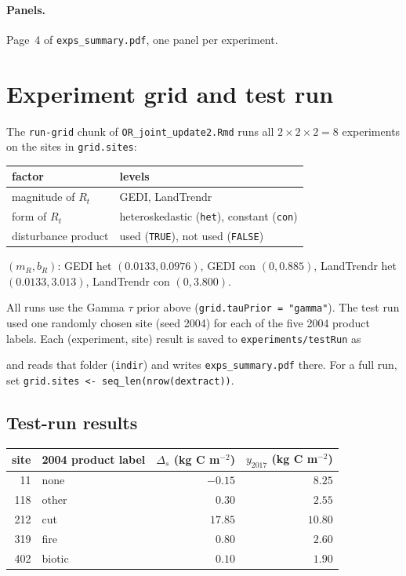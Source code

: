 \documentclass[11pt]{article}
\newcommand{\code}[1]{\texttt{#1}}
\begin{document}
\paragraph{Panels.} Page~4 of \code{exps\_summary.pdf}, one panel per experiment.

\section{Experiment grid and test run}
\label{sec:runs}

The \code{run-grid} chunk of \code{OR\_joint\_update2.Rmd} runs all $2\times2\times2 = 8$
experiments on the sites in \code{grid.sites}:

\begin{center}
\begin{tabular}{ll}
\toprule
factor & levels\\
\midrule
magnitude of $R_t$ & GEDI, LandTrendr\\
form of $R_t$ & heteroskedastic (\code{het}), constant (\code{con})\\
disturbance product & used (\code{TRUE}), not used (\code{FALSE})\\
\bottomrule
\end{tabular}

\smallskip
$(m_R, b_R)$: GEDI het $(0.0133, 0.0976)$, GEDI con $(0, 0.885)$,
LandTrendr het $(0.0133, 3.013)$, LandTrendr con $(0, 3.800)$.
\end{center}

All runs use the Gamma $\tau$ prior above (\code{grid.tauPrior = "gamma"}). The test run
used one randomly chosen site (seed 2004) for each of the five 2004 product labels.
Each (experiment, site) result is saved to \code{experiments/testRun} as
\begin{center}\footnotesize{}\end{center}
and  reads that folder (\code{indir}) and writes
\code{exps\_summary.pdf} there. For a full run, set
\code{grid.sites <- seq\_len(nrow(dextract))}.

\subsection*{Test-run results}

\begin{center}
\begin{tabular}{rlrr}
\toprule
site & 2004 product label & $\Delta_s$ (kg C m$^{-2}$) & $y_{2017}$ (kg C m$^{-2}$)\\
\midrule
11  & none   & $-0.15$ & $8.25$\\
118 & other  & $0.30$  & $2.55$\\
212 & cut    & $17.85$ & $10.80$\\
319 & fire   & $0.80$  & $2.60$\\
402 & biotic & $0.10$  & $1.90$\\
\bottomrule
\end{tabular}
\end{center}
\end{document}
